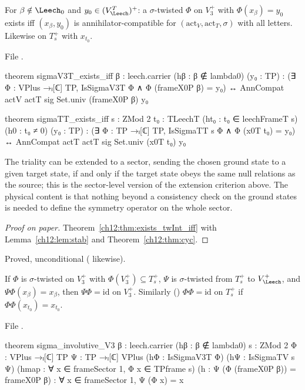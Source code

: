 \begin{theorem}\label{ch12:thm:sigma_exists_iff}
For $\beta\notin\Leech_0$ and $y_0\in(V_\Leech^T)^+$: a $\sigma$-twisted $\Phi$ on $V_3^+$ with
$\Phi(x_\beta)=y_0$ exists iff $(x_\beta,y_0)$ is annihilator-compatible for $(\mathrm{act}_V,\mathrm{act}_T,\sigma)$
with all letters.  Likewise on $T_s^+$ with $x_{t_0}$.
\end{theorem}
File .
\begin{leancode}
theorem sigmaV3T_exists_iff {β : leech.carrier} (hβ : β ∉ lambda0) (y₀ : TP) :
    (∃ Φ : VPlus →ₗ[ℂ] TP, IsSigmaV3T Φ ∧ Φ (frameX0P β) = y₀)
      ↔ AnnCompat actV actT sig Set.univ (frameX0P β) y₀

theorem sigmaTT_exists_iff {s : ZMod 2} {t₀ : TLeechT} (ht₀ : t₀ ∈ leechFrameT s) (h0 : t₀ ≠ 0)
    (y₀ : TP) :
    (∃ Φ : TP →ₗ[ℂ] TP, IsSigmaTT s Φ ∧ Φ (x0T t₀) = y₀)
      ↔ AnnCompat actT actT sig Set.univ (x0T t₀) y₀
\end{leancode}

\begin{physics}
The triality can be extended to a sector, sending the chosen ground state to a given target state, if and only if the target state obeys the same null relations as the source; this is the sector-level version of the extension criterion above. The physical content is that nothing beyond a consistency check on the ground states is needed to define the symmetry operator on the whole sector.
\end{physics}
\begin{proof}[Proof on paper]
Theorem~\ref{ch12:thm:exists_twInt_iff} with Lemma~\ref{ch12:lem:stab} and Theorem~\ref{ch12:thm:cyc}.
\end{proof}
\begin{status}Proved, unconditional ( likewise).\end{status}

\begin{theorem}\label{ch12:thm:invol}
If $\Phi$ is $\sigma$-twisted on $V_3^+$ with $\Phi(V_3^+)\subseteq T_s^+$, $\Psi$ is $\sigma$-twisted from
$T_s^+$ to $V_\Leech^+$, and $\Psi\Phi(x_\beta)=x_\beta$, then $\Psi\Phi=\mathrm{id}$ on $V_3^+$.  Similarly
() $\Phi\Phi=\mathrm{id}$ on $T_s^+$ if $\Phi\Phi(x_{t_0})=x_{t_0}$.
\end{theorem}
File .
\begin{leancode}
theorem sigma_involutive_V3 {β : leech.carrier} (hβ : β ∉ lambda0) {s : ZMod 2}
    {Φ : VPlus →ₗ[ℂ] TP} {Ψ : TP →ₗ[ℂ] VPlus} (hΦ : IsSigmaV3T Φ) (hΨ : IsSigmaTV s Ψ)
    (hmap : ∀ x ∈ frameSector 1, Φ x ∈ TPframe s) (h : Ψ (Φ (frameX0P β)) = frameX0P β) :
    ∀ x ∈ frameSector 1, Ψ (Φ x) = x
\end{leancode}

